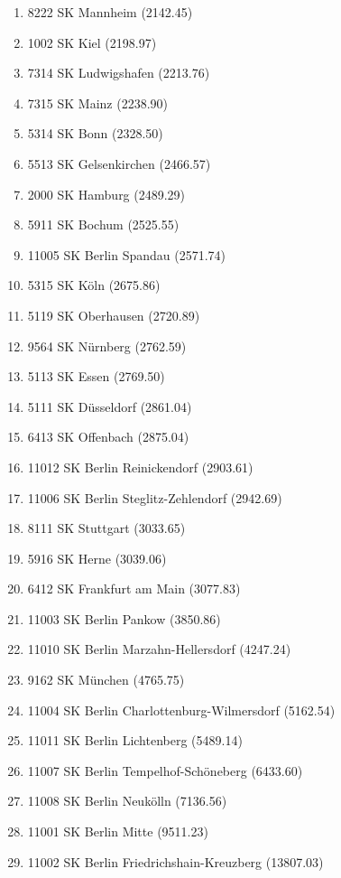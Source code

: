 \begin{enumerate}[itemsep=-6mm]
\item 8222 SK Mannheim (2142.45)
\item 1002 SK Kiel (2198.97)
\item 7314 SK Ludwigshafen (2213.76)
\item 7315 SK Mainz (2238.90)
\item 5314 SK Bonn (2328.50)
\item 5513 SK Gelsenkirchen (2466.57)
\item 2000 SK Hamburg (2489.29)
\item 5911 SK Bochum (2525.55)
\item 11005 SK Berlin Spandau (2571.74)
\item 5315 SK Köln (2675.86)
\item 5119 SK Oberhausen (2720.89)
\item 9564 SK Nürnberg (2762.59)
\item 5113 SK Essen (2769.50)
\item 5111 SK Düsseldorf (2861.04)
\item 6413 SK Offenbach (2875.04)
\item 11012 SK Berlin Reinickendorf (2903.61)
\item 11006 SK Berlin Steglitz-Zehlendorf (2942.69)
\item 8111 SK Stuttgart (3033.65)
\item 5916 SK Herne (3039.06)
\item 6412 SK Frankfurt am Main (3077.83)
\item 11003 SK Berlin Pankow (3850.86)
\item 11010 SK Berlin Marzahn-Hellersdorf (4247.24)
\item 9162 SK München (4765.75)
\item 11004 SK Berlin Charlottenburg-Wilmersdorf (5162.54)
\item 11011 SK Berlin Lichtenberg (5489.14)
\item 11007 SK Berlin Tempelhof-Schöneberg (6433.60)
\item 11008 SK Berlin Neukölln (7136.56)
\item 11001 SK Berlin Mitte (9511.23)
\item 11002 SK Berlin Friedrichshain-Kreuzberg (13807.03)
\end{enumerate}